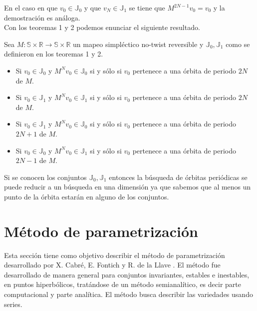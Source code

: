 En el caso en que $v_{0}\in \mathbb{J}_{0}$ y que $v_{N}\in\mathbb{J}_{1}$ se tiene que $M^{2N-1}v_{0}=v_{0}$ y la demostraci\'on es an\'aloga. \\

Con los teoremas 1 y 2 podemos enunciar el siguiente resultado.

\begin{corola}
		Sea $M:\mathbb{S} \times \mathbb{R} \longrightarrow \mathbb{S}\times\mathbb{R}$ un mapeo simpl\'ectico no-twist reversible y $\mathbb{J}_{0}, \mathbb{J}_{1}$ como se definieron en los teoremas 1 y 2. 
		\begin{itemize}
			\item Si $v_{0}\in \mathbb{J}_{0}$ y $M^{N}v_{0}\in \mathbb{J}_{0}$ si y s\'olo si $v_{0}$ pertenece a una \'orbita de periodo $2N$ de $M$.
			\item Si $v_{0}\in \mathbb{J}_{1}$ y $M^{N}v_{0}\in \mathbb{J}_{1}$ si y s\'olo si $v_{0}$ pertenece a una \'orbita de periodo $2N$ de $M$.
			\item Si $v_{0}\in \mathbb{J}_{1}$ y $M^{N}v_{0}\in \mathbb{J}_{0}$ si y s\'olo si $v_{0}$ pertenece a una \'orbita de periodo $2N+1$ de $M$.
			\item Si $v_{0}\in \mathbb{J}_{0}$ y $M^{N}v_{0}\in \mathbb{J}_{1}$ si y s\'olo si $v_{0}$ pertenece a una \'orbita de periodo $2N-1$ de $M$.
		\end{itemize}
\end{corola}
Si se conocen los conjuntos $\mathbb{J}_{0}, \mathbb{J}_{1}$ entonces la b\'usqueda de \'orbitas peri\'odicas se puede reducir a un b\'usqueda en una dimensi\'on ya que sabemos que al menos un punto de la \'orbita estar\'an en alguno de los conjuntos.









\section{Método de parametrización}
 Esta sección tiene como objetivo describir el método de parametrización desarrollado por X. Cabré, E. Fontich y R. de la Llave \cite{Haro}. El método fue desarrollado de manera general para conjuntos invariantes, estables e inestables, en puntos hiperbólicos, tratándose de un método semianalítico, es decir parte computacional y parte analítica. El m\'etodo busca describir las variedades usando series.\\
	
